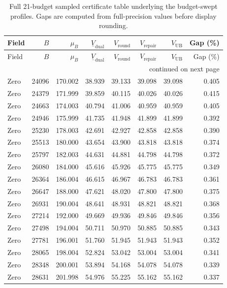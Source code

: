 \begin{longtable}{lrrrrrrr}
\caption{Full 21-budget sampled certificate table underlying the budget-swept
profiles. Gaps are computed from full-precision values before display rounding.}
\label{tab:sweep-full-si}\\
\toprule
Field & $B$ & $\mu_B$ & $\underline V_{\mathrm{dual}}$ & $V_{\mathrm{round}}$ &
$V_{\mathrm{repair}}$ & $V_{\mathrm{UB}}$ & Gap (\%)\\
\midrule
\endfirsthead
\toprule
Field & $B$ & $\mu_B$ & $\underline V_{\mathrm{dual}}$ & $V_{\mathrm{round}}$ &
$V_{\mathrm{repair}}$ & $V_{\mathrm{UB}}$ & Gap (\%)\\
\midrule
\endhead
\midrule\multicolumn{8}{r}{continued on next page}\\
\endfoot
\bottomrule
\endlastfoot
Zero & 24096 & 170.002 & 38.939 & 39.133 & 39.098 & 39.098 & 0.405\\
Zero & 24379 & 171.999 & 39.859 & 40.115 & 40.026 & 40.026 & 0.415\\
Zero & 24663 & 174.003 & 40.794 & 41.006 & 40.959 & 40.959 & 0.405\\
Zero & 24946 & 175.999 & 41.735 & 41.948 & 41.899 & 41.899 & 0.392\\
Zero & 25230 & 178.003 & 42.691 & 42.927 & 42.858 & 42.858 & 0.390\\
Zero & 25513 & 180.000 & 43.654 & 43.900 & 43.818 & 43.818 & 0.374\\
Zero & 25797 & 182.003 & 44.631 & 44.881 & 44.798 & 44.798 & 0.372\\
Zero & 26080 & 184.000 & 45.616 & 45.926 & 45.775 & 45.775 & 0.349\\
Zero & 26364 & 186.004 & 46.615 & 46.967 & 46.783 & 46.783 & 0.361\\
Zero & 26647 & 188.000 & 47.621 & 48.020 & 47.800 & 47.800 & 0.375\\
Zero & 26931 & 190.004 & 48.641 & 48.931 & 48.821 & 48.821 & 0.368\\
Zero & 27214 & 192.000 & 49.669 & 49.936 & 49.846 & 49.846 & 0.356\\
Zero & 27498 & 194.004 & 50.711 & 50.970 & 50.885 & 50.885 & 0.343\\
Zero & 27781 & 196.001 & 51.760 & 51.945 & 51.943 & 51.943 & 0.352\\
Zero & 28065 & 198.004 & 52.824 & 53.042 & 53.004 & 53.004 & 0.341\\
Zero & 28348 & 200.001 & 53.894 & 54.168 & 54.078 & 54.078 & 0.339\\
Zero & 28631 & 201.998 & 54.976 & 55.225 & 55.162 & 55.162 & 0.337\\

\end{longtable}
